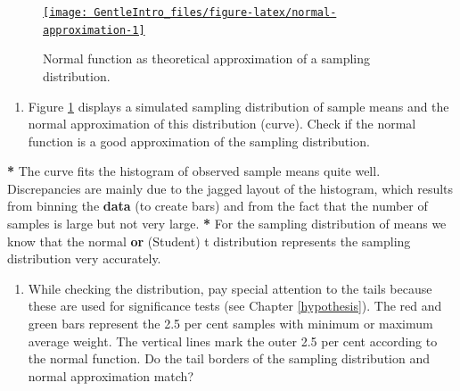 \documentclass[a4paper]{book}
\newenvironment{Shaded}{\begin{snugshade}}{\end{snugshade}}
\newcommand{\KeywordTok}[1]{\textcolor[rgb]{0,0,0}{\textbf{#1}}}
\newcommand{\FloatTok}[1]{\textcolor[rgb]{0.00,0.00,0.00}{#1}}
\newcommand{\StringTok}[1]{\textcolor[rgb]{0.00,0.00,0.00}{#1}}
\newcommand{\ControlFlowTok}[1]{\textcolor[rgb]{0.00,0.00,0.00}{\textbf{#1}}}
\newcommand{\OperatorTok}[1]{\textcolor[rgb]{0.00,0.00,0.00}{\textbf{#1}}}
\newcommand{\NormalTok}[1]{#1}
\providecommand{\tightlist}{%
  \setlength{\itemsep}{0pt}\setlength{\parskip}{0pt}}
\theoremstyle{definition}
\theoremstyle{definition}
\theoremstyle{definition}
\theoremstyle{remark}
\begin{document}
\begin{figure}[H]
\href{http://82.196.4.233:3838/apps/normal-approximation/}{\texttt{[image: GentleIntro\_files/figure-latex/normal-approximation-1]} }\caption{Normal function as theoretical approximation of a sampling distribution.}\label{fig:normal-approximation}
\end{figure}

\begin{enumerate}
\def\labelenumi{\arabic{enumi}.}
\tightlist
\item
  Figure \ref{fig:normal-approximation} displays a simulated sampling
  distribution of sample means and the normal approximation of this
  distribution (curve). Check if the normal function is a good
  approximation of the sampling distribution.
\end{enumerate}

\begin{Shaded}
\begin{Highlighting}[]
\OperatorTok{*}\StringTok{ }\NormalTok{The curve fits the histogram of observed sample means quite well.}
\NormalTok{Discrepancies are mainly due to the jagged layout of the histogram, which}
\NormalTok{results from binning the }\KeywordTok{data}\NormalTok{ (to create bars) and from the fact that the}
\NormalTok{number of samples is large but not very large.}
\OperatorTok{*}\StringTok{ }\NormalTok{For the sampling distribution of means we know that the normal }\KeywordTok{or}\NormalTok{ (Student)}
\NormalTok{t distribution represents the sampling distribution very accurately.}
\end{Highlighting}
\end{Shaded}

\begin{enumerate}
\def\labelenumi{\arabic{enumi}.}
\setcounter{enumi}{1}
\tightlist
\item
  While checking the distribution, pay special attention to the tails
  because these are used for significance tests (see Chapter
  \ref{hypothesis}). The red and green bars represent the 2.5 per cent
  samples with minimum or maximum average weight. The vertical lines
  mark the outer 2.5 per cent according to the normal function. Do the
  tail borders of the sampling distribution and normal approximation
  match?
\end{enumerate}

\begin{Shaded}
\end{Shaded}
\end{document}
